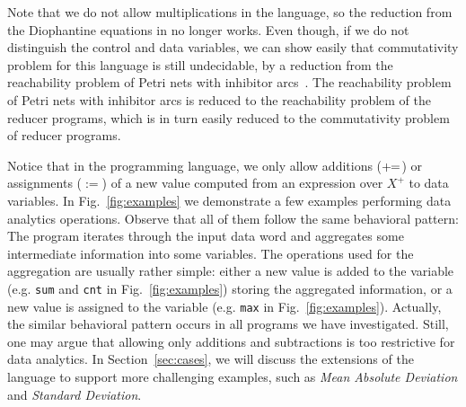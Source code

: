 Note that we do not allow multiplications in the language, so the reduction from the Diophantine equations in \cite{CHSW15} no longer works. Even though, if we do not distinguish the control and data variables, we can show easily that commutativity problem for this language is still undecidable, by a reduction from the reachability problem of Petri nets with inhibitor arcs~\cite{Min71,Rei08}.
The reachability problem of Petri nets with inhibitor arcs is reduced to the reachability problem of the reducer programs, which is in turn easily reduced to the commutativity problem of reducer programs.

Notice that in the programming language, we only allow additions ($+\!\!=$) or assignments ($:=$) of a new value computed from an expression over $X^+$ to data variables. 
In Fig.~\ref{fig:examples} we demonstrate a few examples performing data analytics operations. Observe that all of them follow the same behavioral pattern: The program iterates through the input data word and aggregates some intermediate information into some variables. The operations used for the aggregation are usually rather simple: either a new value is added to the variable (e.g. \texttt{sum} and \texttt{cnt} in Fig.~\ref{fig:examples}) storing the aggregated information, or a new value is assigned to the variable (e.g. \texttt{max} in Fig.~\ref{fig:examples}). Actually, the similar behavioral pattern occurs in all programs we have investigated.
Still, one may argue that allowing only additions and subtractions is too restrictive for data analytics. 
In Section~\ref{sec:cases}, we will discuss the extensions of the language to support more challenging examples, such as \emph{Mean Absolute Deviation} and \emph{Standard Deviation}.



 

